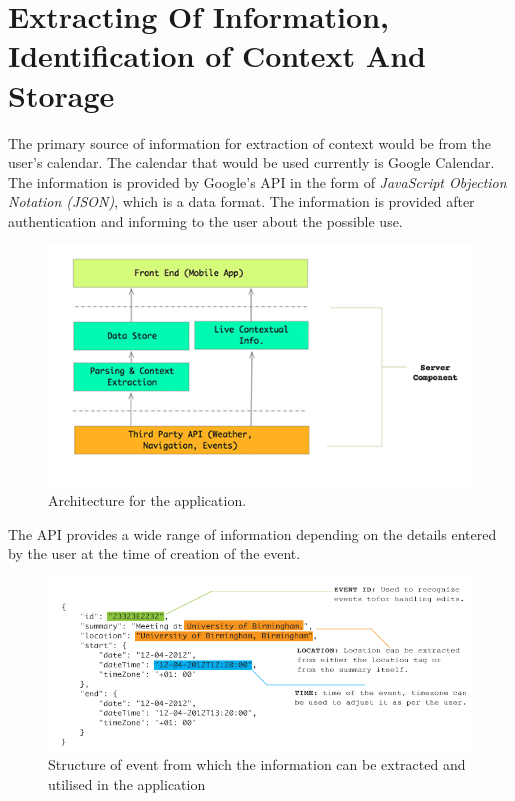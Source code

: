 \documentclass[12pt]{report}
\begin{document}
\section{Extracting Of Information, Identification of Context And Storage}

The primary source of information for extraction of context would be from the user's calendar. The calendar that would be used currently is Google Calendar. The information is provided by Google's API in the form of \textit{JavaScript Objection Notation (JSON)}, which is a data format. The information is provided after authentication and informing to the user about the possible use.

\begin{figure}[htbp]
 \centering
 \includegraphics[width=150mm]{AppArch.png}
   \caption [Architecture for the application.]{Architecture for the application.}
 \label{figure:AppArch}
\end{figure}


The API provides a wide range of information depending on the details entered by the user at the time of creation of the event.


\begin{figure}[htbp]
 \centering
 \includegraphics[width=150mm]{DataStructure.png}
   \caption[Structure of an \textit{event}.]{Structure of event from which the information can be extracted and utilised in the application}
 \label{figure:DataStruct}
\end{figure}
\end{document}
